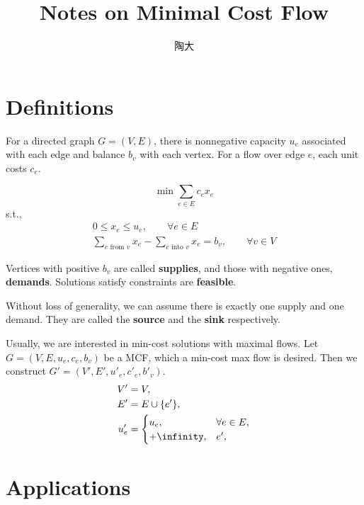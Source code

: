 \documentclass[UTF8,a4paper]{ctexart}
\title{Notes on Minimal Cost Flow}
\author{陶大}
\renewcommand{\emph}[1]{\textbf{#1}}
\begin{document}
\maketitle
\tableofcontents

\section{Definitions}

For a directed graph $G=(V, E)$, there is nonnegative capacity $u_e$ associated with each edge
and balance $b_v$ with each vertex.
For a flow over edge $e$, each unit costs $c_e$.

\[
    \min \sum_{e\in E} c_e x_e
\]
s.t.,
\begin{align}
    0\leqslant x_e \leqslant u_e,\qquad \forall e\in E\\
    \sum_{e\text{ from }v} x_e - \sum_{e\text{ into }v} x_e = b_v,\qquad \forall v\in V
\end{align}

Vertices with positive $b_v$ are called \emph{supplies},
and those with negative ones, \emph{demands}.
Solutions satisfy constraints are \emph{feasible}.

Without loss of generality, we can assume there is exactly one supply and one demand.
They are called the \emph{source} and the \emph{sink} respectively.

Usually, we are interested in min-cost solutions with maximal flows.
Let $G=(V, E, {u_e}, {c_e}, {b_v})$ be a MCF, which a min-cost max flow is desired.
Then we construct $G'=(V', E', {u'_e}, {c'_e}, {b'_v})$.
\begin{align}
    V'&=V,\\
    E'&=E\cup\{e'\},\\
    u'_e&=\begin{cases}
        u_e,&\forall e\in E,\\
        +\infinity,&e',
    \end{cases}\\
\end{align}



\section{Applications}
\end{document}
